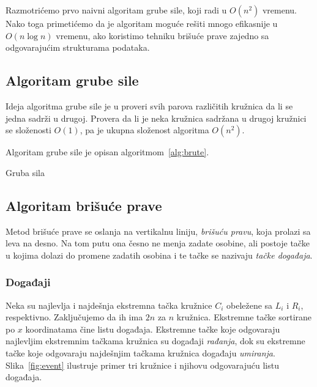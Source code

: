 \documentclass[a4paper,12pt]{article}
\begin{document}
Razmotrićemo prvo naivni algoritam grube sile, koji radi u $O(n^2)$ vremenu. Nako toga primetićemo da je algoritam moguće rešiti mnogo efikasnije u $O(n \log n)$ vremenu, ako koristimo tehniku brišuće prave zajedno sa odgovarajućim strukturama podataka.

\subsection{Algoritam grube sile}
\label{sub:brute}

Ideja algoritma grube sile je u proveri svih parova različitih kružnica da li se jedna sadrži u drugoj. Provera da li je neka kružnica sadržana u drugoj kružnici se složenosti $O(1)$, pa je ukupna složenost algoritma $O(n^2)$.

Algoritam grube sile je opisan algoritmom~\ref{alg:brute}.

\begin{algorithm}
    \caption{Gruba sila}\label{alg:brute}
\end{algorithm}

\subsection{Algoritam brišuće prave}
\label{sub:sweep}

Metod brišuće prave se oslanja na vertikalnu liniju, \emph{brišuću pravu}, koja prolazi sa leva na desno. Na tom putu ona česno ne menja zadate osobine, ali postoje tačke u kojima dolazi do promene zadatih osobina i te tačke se nazivaju \emph{tačke događaja}.

\subsubsection{Događaji}
\label{subsub:event}

Neka su najlevlja i najdešnja ekstremna tačka kružnice $C_i$ obeležene sa $L_i$ i $R_i$, respektivno. Zaključujemo da ih ima $2n$ za $n$ kružnica. Ekstremne tačke sortirane po $x$ koordinatama čine listu događaja. Ekstremne tačke koje odgovaraju najlevljim ekstremnim tačkama kružnica su događaji \emph{rađanja}, dok su ekstremne tačke koje odgovaraju najdešnjim tačkama kružnica događaju \emph{umiranja}. Slika~\ref{fig:event} ilustruje primer tri kružnice i njihovu odgovarajuću listu događaja.
\end{document}

